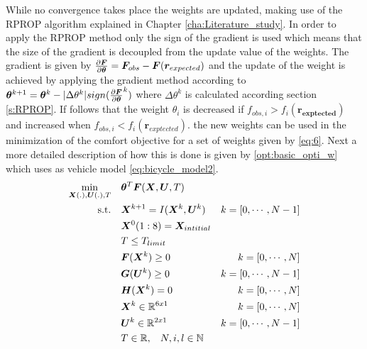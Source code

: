 While no convergence takes place the weights are updated, making use of the RPROP algorithm explained in Chapter \ref{cha:Literature_study}. In order to apply the RPROP method only the sign of the gradient is used which means that the size of the gradient is decoupled from the update value of the weights. The gradient is given by $\pdv{\bm{F}}{\bm{\theta}} = \bm{F}_{obs} - \bm{F}(\bm{r}_{expected})$  and the update of the weight is achieved by applying the gradient method according to $\bm{\theta}^{k+1} = \bm{\theta}^{k} - |\Delta \theta^{k}|sign( \pdv{\bm{F}}{\bm{\theta}}^k )$ where $\Delta \theta^{k}$ is calculated according section \ref{s:RPROP}. If follows that the weight $\theta_i$ is decreased if $f_{obs,i}>f_{i}(\bm{r_{exptected}})$ and increased when $f_{obs,i}<f_{i}(\bm{r}_{exptected})$. the new weights can be used in the minimization of the comfort objective for a set of weights given by \ref{eq:6}. Next a more detailed description of how this is done is given by \ref{opt:basic_opti_w} which uses as vehicle model \ref{eq:bicycle_model2}. \\

\begin{equation}\label{opt:basic_opti_w}
\begin{aligned}
\min_{\bm{X}(.),\bm{U}(.), T} \quad &  \bm{\theta}^T\bm{F}(\bm{X},\bm{U}, T) \\
\textrm{s.t.} \quad & \bm{X}^{k+1} = I(\bm{X}^{k}, \bm{U}^{k}) & k = [0,\cdots, N-1]\\
& \bm{X}^{0}(1:8)= \bm{X}_{intitial} \\
& T \leq T_{limit}\\
& \bm{F}(\bm{X}^{k}) \geq 0	& k = [0,\cdots, N]\\
& \bm{G}(\bm{U}^{k}) \geq 0	& k = [0,\cdots, N-1]\\
& \bm{H}(\bm{X}^{k}) = 0	& k = [0,\cdots, N]\\
& \bm{X}^{k}\in \mathbb{R}^{6x1}  & k = [0,\cdots, N]\\
& \bm{U}^{k}\in \mathbb{R}^{2x1} \hspace{3 mm} & k = [0,\cdots, N-1]\\
& T \in \mathbb{R},\hspace{3 mm} N,i,l \in \mathbb{N}
\end{aligned}
\end{equation}

